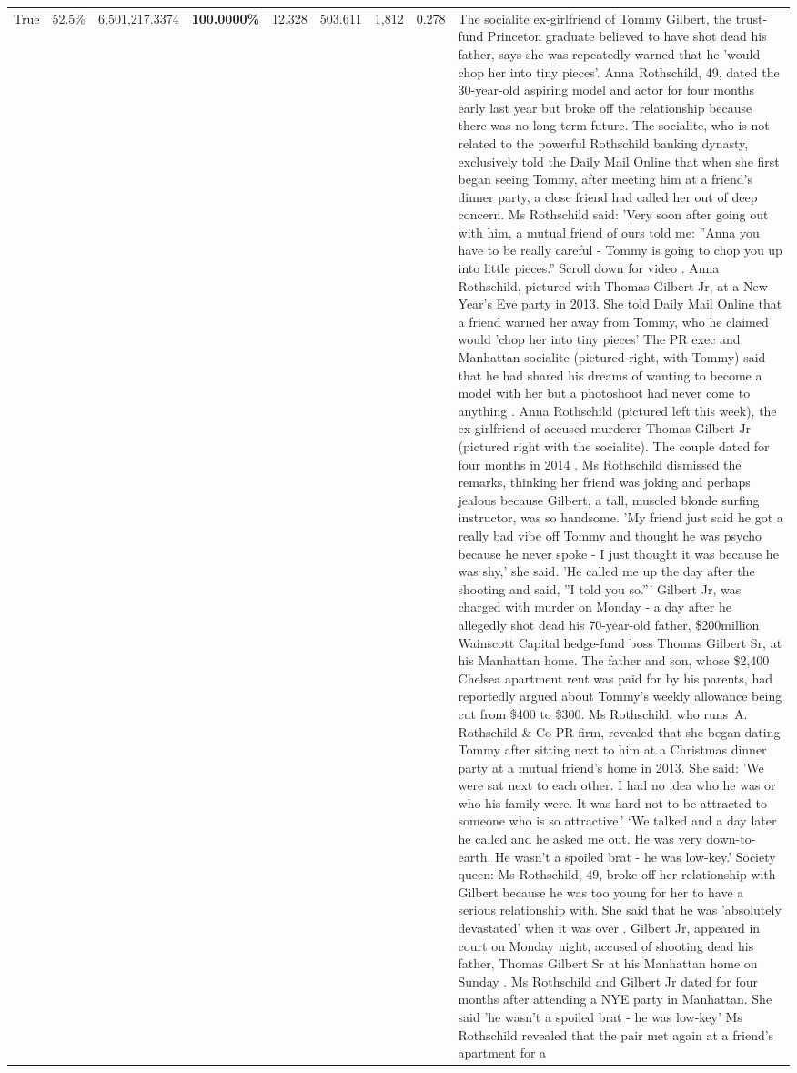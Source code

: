 \begin{table}[H]
\begin{tabular}{lllrlllll}
True & 52.5\% & 6,501,217.3374 & \bfseries \color{red} 100.0000\% & 12.328 & 503.611 & 1,812 & 0.278 & The socialite ex-girlfriend of Tommy Gilbert, the trust-fund Princeton graduate believed to have shot dead his father, says she was repeatedly warned that he 'would chop her into tiny pieces'. Anna Rothschild, 49, dated the 30-year-old aspiring model and actor for four months early last year but broke off the relationship because there was no long-term future. The socialite, who is not related to the powerful Rothschild banking dynasty, exclusively told the Daily Mail Online that when she first began seeing Tommy, after meeting him at a friend's dinner party, a close friend had called her out of deep concern. Ms Rothschild said: 'Very soon after going out with him, a mutual friend of ours told me: ''Anna you have to be really careful - Tommy is going to chop you up into little pieces.'' Scroll down for video . Anna Rothschild, pictured with Thomas Gilbert Jr, at a New Year's Eve party in 2013. She told Daily Mail Online that a friend warned her away from Tommy, who he claimed would 'chop her into tiny pieces' The PR exec and Manhattan socialite (pictured right, with Tommy) said that he had shared his dreams of wanting to become a model with her but a photoshoot had never come to anything . Anna Rothschild (pictured left this week), the ex-girlfriend of accused murderer Thomas Gilbert Jr (pictured right with the socialite). The couple dated for four months in 2014 . Ms Rothschild dismissed the remarks, thinking her friend was joking and perhaps jealous because Gilbert, a tall, muscled blonde surfing instructor, was so handsome. 'My friend just said he got a really bad vibe off Tommy and thought he was psycho because he never spoke - I just thought it was because he was shy,' she said. 'He called me up the day after the shooting and said, ''I told you so.''' Gilbert Jr, was charged with murder on Monday - a day after he allegedly shot dead his 70-year-old father, \$200million Wainscott Capital hedge-fund boss Thomas Gilbert Sr, at his Manhattan home. The father and son, whose \$2,400 Chelsea apartment rent was paid for by his parents, had reportedly argued about Tommy's weekly allowance being cut from \$400 to \$300. Ms Rothschild, who runs A. Rothschild \& Co PR firm, revealed that she began dating Tommy after sitting next to him at a Christmas dinner party at a mutual friend's home in 2013. She said: 'We were sat next to each other. I had no idea who he was or who his family were. It was hard not to be attracted to someone who is so attractive.' ‘We talked and a day later he called and he asked me out. He was very down-to-earth. He wasn’t a spoiled brat - he was low-key.’ Society queen: Ms Rothschild, 49, broke off her relationship with Gilbert because he was too young for her to have a serious relationship with. She said that he was 'absolutely devastated' when it was over . Gilbert Jr, appeared in court on Monday night, accused of shooting dead his father, Thomas Gilbert Sr at his Manhattan home on Sunday . Ms Rothschild and Gilbert Jr dated for four months after attending a NYE party in Manhattan. She said 'he wasn't a spoiled brat - he was low-key' Ms Rothschild revealed that the pair met again at a friend’s apartment for a 
\end{tabular}
\end{table}
